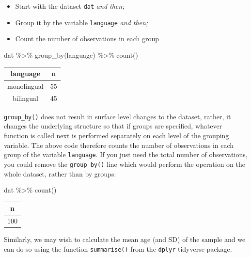 \documentclass[
  english,
  doc,floatsintext]{apa6}
\newenvironment{Shaded}{\begin{snugshade}}{\end{snugshade}}
\newcommand{\FunctionTok}[1]{\textcolor[rgb]{0.00,0.00,0.00}{#1}}
\newcommand{\NormalTok}[1]{#1}
\newcommand{\SpecialCharTok}[1]{\textcolor[rgb]{0.00,0.00,0.00}{#1}}
\begin{document}
\begin{itemize}
\item
  Start with the dataset \texttt{dat} \emph{and then;}
\item
  Group it by the variable \texttt{language} \emph{and then;}
\item
  Count the number of observations in each group
\end{itemize}

\begin{Shaded}
\begin{Highlighting}[]
\NormalTok{dat }\SpecialCharTok{\%\textgreater{}\%}
  \FunctionTok{group\_by}\NormalTok{(language) }\SpecialCharTok{\%\textgreater{}\%}
  \FunctionTok{count}\NormalTok{()}
\end{Highlighting}
\end{Shaded}

\begin{tabular}{c|c}
\hline
language & n\\
\hline
monolingual & 55\\
\hline
bilingual & 45\\
\hline
\end{tabular}

\texttt{group\_by()} does not result in surface level changes to the dataset, rather, it changes the underlying structure so that if groups are specified, whatever function is called next is performed separately on each level of the grouping variable. The above code therefore counts the number of observations in each group of the variable \texttt{language}. If you just need the total number of observations, you could remove the \texttt{group\_by()} line which would perform the operation on the whole dataset, rather than by groups:

\begin{Shaded}
\begin{Highlighting}[]
\NormalTok{dat }\SpecialCharTok{\%\textgreater{}\%}
  \FunctionTok{count}\NormalTok{()}
\end{Highlighting}
\end{Shaded}

\begin{tabular}{c}
\hline
n\\
\hline
100\\
\hline
\end{tabular}

Similarly, we may wish to calculate the mean age (and SD) of the sample and we can do so using the function \texttt{summarise()} from the \texttt{dplyr} tidyverse package.
\end{document}
